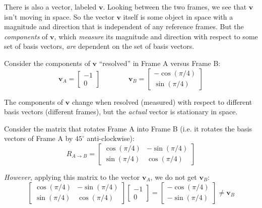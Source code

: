 There is also a vector, labeled $\bm{v}$. Looking between the two
frames, we see that $\bm{v}$ isn't moving in space. So the vector
$\bm{v}$ itself is some object in space with a magnitude and direction
that is independent of any reference frames. But the \textit{components} of
$\bm{v}$, which \textit{measure} its magnitude and direction with respect to
some set of basis vectors, \textit{are} dependent on the set of basis vectors.

Consider the components of $\bm{v}$ ``resolved'' in Frame A versus Frame B:
\begin{equation*}
    \bm{v}_A = \begin{bmatrix}
        -1 \\
        0
    \end{bmatrix}
    \quad\quad\quad\quad
    \bm{v}_B = \begin{bmatrix}
        -\cos(\pi/4) \\
        \sin(\pi/4)
    \end{bmatrix}
\end{equation*}

The components of $\bm{v}$ change when resolved (measured) with respect to
different basis vectors (different frames), but the \textit{actual} vector
is stationary in space.

Consider the matrix that rotates Frame A into Frame B (i.e. it rotates the
basis vectors of Frame A by $45^\circ$ anti-clockwise):
\begin{equation*}
    R_{A \to B} = \begin{bmatrix}
        \cos(\pi/4) & -\sin(\pi/4) \\
        \sin(\pi/4) & \cos(\pi/4)
    \end{bmatrix}
\end{equation*}

\textit{However}, applying this matrix to the vector $\bm{v}_A$, we do not
get $\bm{v}_B$:
\begin{equation*}
    \begin{bmatrix}
        \cos(\pi/4) & -\sin(\pi/4) \\
        \sin(\pi/4) & \cos(\pi/4)
    \end{bmatrix}
    \begin{bmatrix}
        -1 \\
        0
    \end{bmatrix}
    =
    \begin{bmatrix}
        -\cos(\pi/4) \\
        -\sin(\pi/4)
    \end{bmatrix}
    \neq
    \bm{v}_B
\end{equation*}


